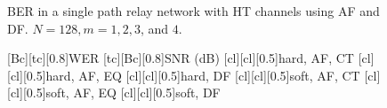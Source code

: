 \begin{figure}
{}
\caption{BER in a single path relay network with HT channels using AF and DF.  $N = 128, m = 1, 2, 3$, and $4$.}
\label{fig:sp_af_df_ber_plots_HT}
\end{figure}

\begin{figure}
    [Bc][tc][0.8]{WER}
    [tc][Bc][0.8]{SNR (dB)}
    [cl][cl][0.5]{hard, AF, CT}
    [cl][cl][0.5]{hard, AF, EQ}
    [cl][cl][0.5]{hard, DF}
    [cl][cl][0.5]{soft, AF, CT}
    [cl][cl][0.5]{soft, AF, EQ}
    [cl][cl][0.5]{soft, DF}

\centerline{
	 \\
}
\centerline{
}
\end{figure}
